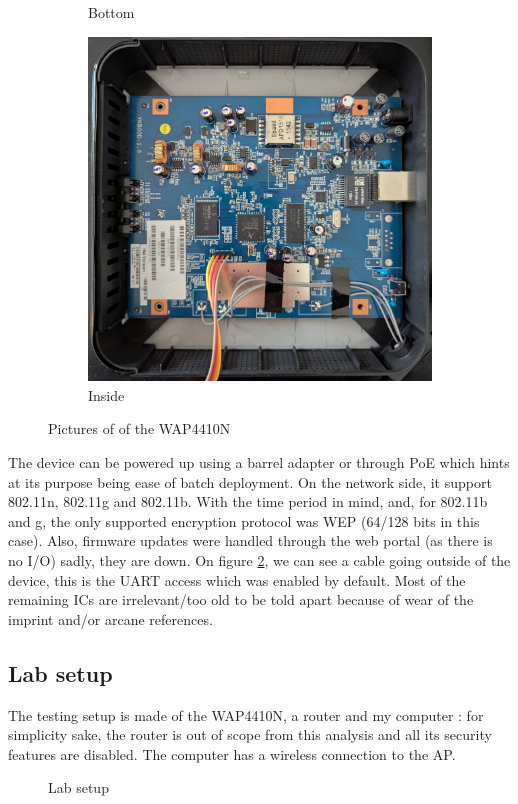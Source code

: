 \documentclass{article}
\begin{document}
\begin{figure}[!h]
\begin{subfigure}{0.3\textwidth}
		\caption{Bottom}
		\label{bottom}
	\end{subfigure}
	\begin{subfigure}{0.3\textwidth}
		\includegraphics[width=\textwidth]{inside.jpg}
		\caption{Inside}
		\label{inside}
	\end{subfigure}
	\caption{Pictures of of the WAP4410N}
	\label{wap4410n}
\end{figure}

The device can be powered up using a barrel adapter or through PoE which hints at its purpose being ease of batch deployment. On the network side, it support 802.11n, 802.11g and 802.11b. With the time period in mind, and, for 802.11b and g, the only supported encryption protocol was WEP (64/128 bits in this case). Also, firmware updates were handled through the web portal (as there is no I/O) sadly, they are down. On figure \ref{inside}, we can see a cable going outside of the device, this is the UART access which was enabled by default. Most of the remaining ICs are irrelevant/too old to be told apart because of wear of the imprint and/or arcane references.
\subsection{Lab setup}
The testing setup is made of the WAP4410N, a router and my computer : for simplicity sake, the router is out of scope from this analysis and all its security features are disabled. The computer has a  wireless connection to the AP.
\begin{figure}[!ht]
		
	\caption{Lab setup}
\end{figure}
\end{document}
